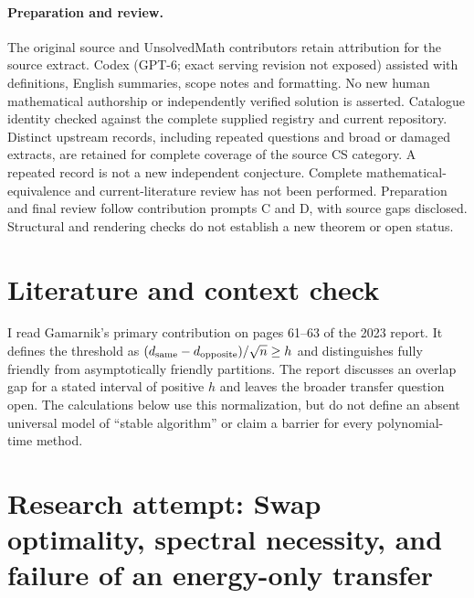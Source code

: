 \documentclass[11pt]{article}
\begin{document}
\paragraph{Preparation and review.}
The original source and UnsolvedMath contributors retain attribution for the source extract. Codex (GPT-6; exact serving revision not exposed) assisted with definitions, English summaries, scope notes and formatting. No new human mathematical authorship or independently verified solution is asserted. Catalogue identity checked against the complete supplied registry and current repository. Distinct upstream records, including repeated questions and broad or damaged extracts, are retained for complete coverage of the source CS category. A repeated record is not a new independent conjecture. Complete mathematical-equivalence and current-literature review has not been performed. Preparation and final review follow contribution prompts C and D, with source gaps disclosed. Structural and rendering checks do not establish a new theorem or open status.
\label{end:statement}

\section{Literature and context check}

I read Gamarnik's primary contribution on pages 61--63 of the 2023 report.
It defines the threshold as $(d_{\rm same}-d_{\rm opposite})/\sqrt n\geq h$
and distinguishes fully friendly from asymptotically friendly partitions.
The report discusses an overlap gap for a stated interval of positive $h$ and
leaves the broader transfer question open. The calculations below use this
normalization, but do not define an absent universal model of ``stable algorithm''
or claim a barrier for every polynomial-time method.

\section{Research attempt: Swap optimality, spectral necessity, and failure of an energy-only transfer}
\end{document}
